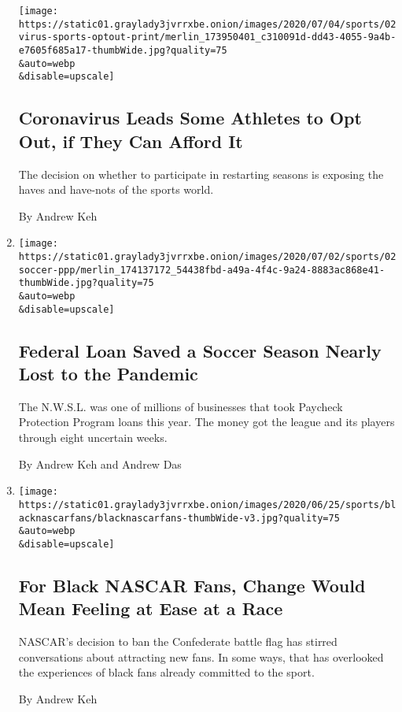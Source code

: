 \begin{enumerate}
  \texttt{[image: https://static01.graylady3jvrrxbe.onion/images/2020/07/04/sports/02virus-sports-optout-print/merlin\_173950401\_c310091d-dd43-4055-9a4b-e7605f685a17-thumbWide.jpg?quality=75\\\&auto=webp\\\&disable=upscale]}

  \hypertarget{coronavirus-leads-some-athletes-to-opt-out-if-they-can-afford-it}{%
  \subsection{Coronavirus Leads Some Athletes to Opt Out, if They Can
  Afford
  It}\label{coronavirus-leads-some-athletes-to-opt-out-if-they-can-afford-it}}

  The decision on whether to participate in restarting seasons is
  exposing the haves and have-nots of the sports world.

  By Andrew Keh
\item
  \href{/2020/07/02/sports/soccer/nwsl-ppp-loan.html}{}

  \texttt{[image: https://static01.graylady3jvrrxbe.onion/images/2020/07/02/sports/02soccer-ppp/merlin\_174137172\_54438fbd-a49a-4f4c-9a24-8883ac868e41-thumbWide.jpg?quality=75\\\&auto=webp\\\&disable=upscale]}

  \hypertarget{federal-loan-saved-a-soccer-season-nearly-lost-to-the-pandemic}{%
  \subsection{Federal Loan Saved a Soccer Season Nearly Lost to the
  Pandemic}\label{federal-loan-saved-a-soccer-season-nearly-lost-to-the-pandemic}}

  The N.W.S.L. was one of millions of businesses that took Paycheck
  Protection Program loans this year. The money got the league and its
  players through eight uncertain weeks.

  By Andrew Keh and Andrew Das
\item
  \href{/2020/06/26/sports/autoracing/nascar-black-fans.html}{}

  \texttt{[image: https://static01.graylady3jvrrxbe.onion/images/2020/06/25/sports/blacknascarfans/blacknascarfans-thumbWide-v3.jpg?quality=75\\\&auto=webp\\\&disable=upscale]}

  \hypertarget{for-black-nascar-fans-change-would-mean-feeling-at-ease-at-a-race}{%
  \subsection{For Black NASCAR Fans, Change Would Mean Feeling at Ease
  at a
  Race}\label{for-black-nascar-fans-change-would-mean-feeling-at-ease-at-a-race}}

  NASCAR's decision to ban the Confederate battle flag has stirred
  conversations about attracting new fans. In some ways, that has
  overlooked the experiences of black fans already committed to the
  sport.

  By Andrew Keh
\end{enumerate}

